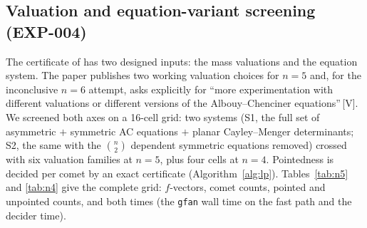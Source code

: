 \documentclass[11pt]{article}
\theoremstyle{definition}
\theoremstyle{remark}
\newcommand{\mk}[1]{\,{\scriptsize[#1]}}
\newcommand{\Vm}{\mk{V}}
\begin{document}
\subsection{Valuation and equation-variant screening (EXP-004)}\label{sec:screening}

The certificate of \cite{JL25} has two designed inputs: the mass valuations and
the equation system. The paper publishes two working valuation choices for
$n=5$ and, for the inconclusive $n=6$ attempt, asks explicitly for
``more experimentation with different valuations or different versions of the
Albouy--Chenciner equations''\Vm. We screened both axes on a 16-cell grid: two
systems (S1, the full set of asymmetric $+$ symmetric AC equations $+$ planar
Cayley--Menger determinants; S2, the same with the $\binom{n}{2}$ dependent
symmetric equations removed) crossed with six valuation families at $n=5$, plus
four cells at $n=4$. Pointedness is decided per comet
by an exact certificate (Algorithm~\ref{alg:lp}). Tables~\ref{tab:n5} and \ref{tab:n4} give
the complete grid: $f$-vectors, comet counts, pointed and unpointed counts, and both times
(the \texttt{gfan} wall time on the fast path and the decider time).
\end{document}
